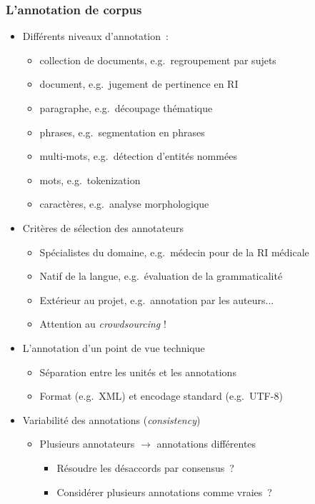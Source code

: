 \begin{frame}[allowframebreaks]
\frametitle{L'annotation de corpus}

\begin{itemize}\itemsep10pt

    \item Différents niveaux d'annotation~:
    \begin{itemize}
        \item collection de documents, e.g.~regroupement par sujets
        \item document, e.g.~jugement de pertinence en RI
        \item paragraphe, e.g.~découpage thématique
        \item phrases, e.g.~segmentation en phrases
        \item multi-mots, e.g.~détection d'entités nommées
        \item mots, e.g.~tokenization
        \item caractères, e.g.~analyse morphologique
    \end{itemize}

    \item Critères de sélection des annotateurs
    \begin{itemize}
        \item Spécialistes du domaine, e.g.~médecin pour de la RI médicale
        \item Natif de la langue, e.g.~évaluation de la grammaticalité
        \item Extérieur au projet, e.g.~annotation par les auteurs...
        \item Attention au \alert{\textit{crowdsourcing}} !
    \end{itemize}

    \framebreak

    \item L'annotation d'un point de vue technique
    \begin{itemize}
        \item Séparation entre les unités et les annotations
        \item Format (e.g.~XML) et encodage standard (e.g.~UTF-8)
    \end{itemize}

    \item Variabilité des annotations (\textit{consistency})
    \begin{itemize}
        \item Plusieurs annotateurs $\to$ annotations différentes
        \begin{itemize}
            \item Résoudre les désaccords par consensus~?
            \item Considérer plusieurs annotations comme vraies~?
        \end{itemize}
    \end{itemize}

\end{itemize}

\end{frame}
